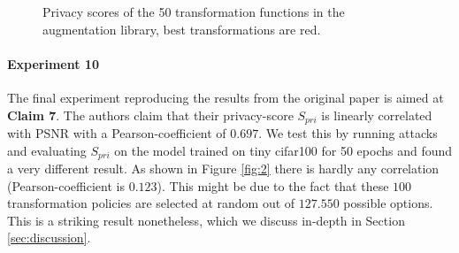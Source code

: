 \begin{figure}[h]
    \centering
    \hspace{5mm}
    \caption{Privacy scores of the 50 transformation functions in the augmentation library, best transformations are red.}
    \label{fig:5}
\end{figure}

\paragraph{Experiment 10}

The final experiment reproducing the results from the original paper is aimed at \textbf{Claim 7}. The authors claim that their privacy-score $S_{pri}$ is linearly correlated with PSNR with a Pearson-coefficient of $0.697$. We test this by running attacks and evaluating $S_{pri}$ on the model trained on tiny cifar100 for 50 epochs and found a very different result. As shown in Figure \ref{fig:2} there is hardly any correlation (Pearson-coefficient is $0.123$). This might be due to the fact that these $100$ transformation policies are selected at random out of $127.550$ possible options. This is a striking result nonetheless, which we discuss in-depth in Section \ref{sec:discussion}.

